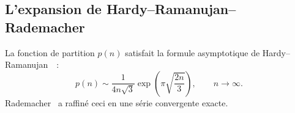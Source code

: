 \subsection{L'expansion de Hardy--Ramanujan--Rademacher}

La fonction de partition $p(n)$ satisfait la formule asymptotique de Hardy--Ramanujan~\cite{hardy_ramanujan_1918}~:
\begin{equation}
  p(n) \sim \frac{1}{4n\sqrt{3}} \exp\left(\pi\sqrt{\frac{2n}{3}}\right), \qquad n \to \infty.
\end{equation}
Rademacher~\cite{rademacher_1937} a raffiné ceci en une série convergente exacte.
